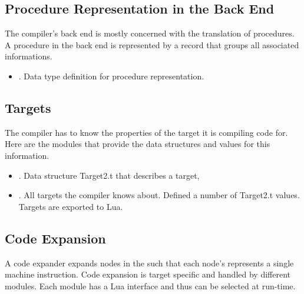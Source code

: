 \documentclass{article}%
\begin{document}
\subsection{Procedure Representation in the Back End}

The compiler's back end is mostly concerned with the translation of
procedures. A procedure in the back end is represented by a record that
groups all associated informations.

\begin{itemize}
    \item {}. Data type definition for procedure
    representation.
\end{itemize}


\subsection{Targets}

The compiler has to know the properties of the target it is compiling
code for. Here are the modules that provide the data structures and
values for this information.

\begin{itemize}
\item {}. Data structure {\Tt{}Target2.t\nwendquote} that
describes a target,

\item {}. All targets the compiler knows about.
Defined a number of {\Tt{}Target2.t\nwendquote} values. Targets are exported to Lua.

\end{itemize}

\subsection{Code Expansion}

A code expander expands nodes in the {\cfg} such that each node's {\rtl}
represents a single machine instruction. Code expansion is target
specific and handled by different modules. Each module has a Lua
interface and thus can be selected at run-time.
\end{document}

